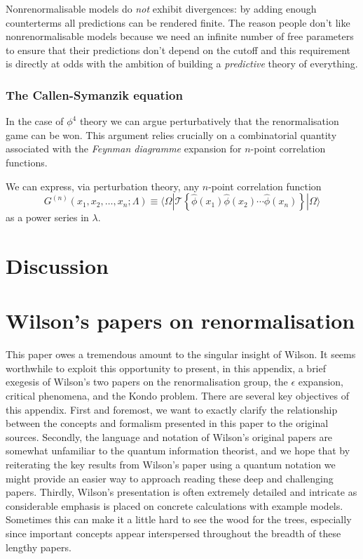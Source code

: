 \documentclass[11pt]{amsart}
\theoremstyle{plain}%
\theoremstyle{definition}
\theoremstyle{remark}
\begin{document}
Nonrenormalisable models do \emph{not} exhibit divergences: by adding enough counterterms all predictions can be rendered finite. The reason people don't like nonrenormalisable models because we need an infinite number of free parameters to ensure that their predictions don't depend on the cutoff and this requirement is directly at odds with the ambition of building a \emph{predictive} theory of everything. 

\subsubsection{The Callen-Symanzik equation}
In the case of $\phi^4$ theory we can argue perturbatively that the renormalisation game can be won. This argument relies crucially on a combinatorial quantity associated with the \emph{Feynman diagramme} expansion for $n$-point correlation functions.  

We can express, via perturbation theory, any $n$-point correlation function
\begin{equation}
	G^{(n)}(x_1, x_2, \ldots, x_n; \Lambda) \equiv \langle \Omega|\mathcal{T}\left\{\widehat{\phi}(x_1)\widehat{\phi}(x_2)\cdots\widehat{\phi}(x_n)\right\}|\Omega\rangle 
\end{equation}
as a power series in $\lambda$. 


\section{Discussion}\label{sec:discussion}






\appendix
\section{Wilson's papers on renormalisation}
This paper owes a tremendous amount to the singular insight of Wilson. It seems worthwhile to exploit this opportunity to present, in this appendix, a brief exegesis of Wilson's two papers \cite{wilson_renormalization_1974,wilson_renormalization_1975} on the renormalisation group, the $\epsilon$ expansion, critical phenomena, and the Kondo problem. There are several key objectives of this appendix. First and foremost, we want to exactly clarify the relationship between the concepts and formalism presented in this paper to the original sources. Secondly, the language and notation of Wilson's original papers are somewhat unfamiliar to the quantum information theorist, and we hope that by reiterating the key results from Wilson's paper using a quantum notation we might provide an easier way to approach reading these deep and challenging papers. Thirdly, Wilson's presentation is often extremely detailed and intricate as considerable emphasis is placed on concrete calculations with example models. Sometimes this can make it a little hard to see the wood for the trees, especially since important concepts appear interspersed throughout the breadth of these lengthy papers. 
\end{document}
